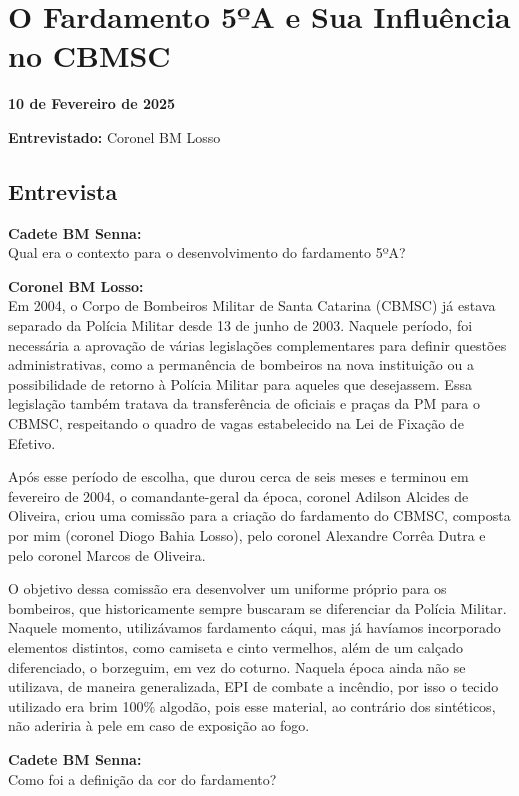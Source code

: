 \chapter{O Fardamento 5ºA e Sua Influência no CBMSC}
\label{ap:losso}

\noindent \textbf{10 de Fevereiro de 2025}


\noindent \textbf{Entrevistado:} Coronel BM Losso

\section*{\textbf{Entrevista}}

\noindent \textbf{Cadete BM Senna:} \\ Qual era o contexto para o desenvolvimento do fardamento 5ºA?

\noindent \textbf{Coronel BM Losso:} \\ Em 2004, o Corpo de Bombeiros Militar de Santa Catarina (CBMSC) já estava separado da Polícia Militar desde 13 de junho de 2003. Naquele período, foi necessária a aprovação de várias legislações complementares para definir questões administrativas, como a permanência de bombeiros na nova instituição ou a possibilidade de retorno à Polícia Militar para aqueles que desejassem. Essa legislação também tratava da transferência de oficiais e praças da PM para o CBMSC, respeitando o quadro de vagas estabelecido na Lei de Fixação de Efetivo.

\noindent Após esse período de escolha, que durou cerca de seis meses e terminou em fevereiro de 2004, o comandante-geral da época, coronel Adilson Alcides de Oliveira, criou uma comissão para a criação do fardamento do CBMSC, composta por mim (coronel Diogo Bahia Losso), pelo coronel Alexandre Corrêa Dutra e pelo coronel Marcos de Oliveira.

\noindent O objetivo dessa comissão era desenvolver um uniforme próprio para os bombeiros, que historicamente sempre buscaram se diferenciar da Polícia Militar. Naquele momento, utilizávamos fardamento cáqui, mas já havíamos incorporado elementos distintos, como camiseta e cinto vermelhos, além de um calçado diferenciado, o borzeguim, em vez do coturno. Naquela época ainda não se utilizava, de maneira generalizada, EPI de combate a incêndio, por isso o tecido utilizado era brim 100\% algodão, pois esse material, ao contrário dos sintéticos, não aderiria à pele em caso de exposição ao fogo.

\noindent \textbf{Cadete BM Senna:} \\ Como foi a definição da cor do fardamento?


